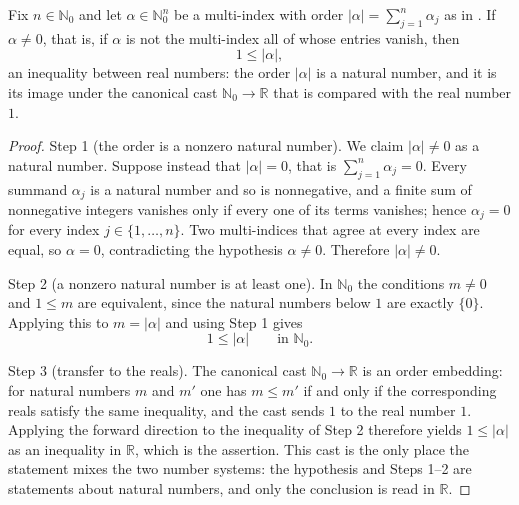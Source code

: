 \begin{lemma}
Fix $n \in \mathbb{N}_0$ and let $\alpha \in \mathbb{N}_0^n$ be a multi-index
with order $|\alpha| = \sum_{j=1}^n \alpha_j$ as in .
If $\alpha \neq 0$, that is, if $\alpha$ is not the multi-index all of whose
entries vanish, then
\[
  1 \leq |\alpha| ,
\]
an inequality between real numbers: the order $|\alpha|$ is a natural number,
and it is its image under the canonical cast $\mathbb{N}_0 \to \mathbb{R}$ that
is compared with the real number $1$.
\end{lemma}
\begin{proof}
Step 1 (the order is a nonzero natural number).  We claim $|\alpha| \neq 0$ as a
natural number.  Suppose instead that $|\alpha| = 0$, that is
$\sum_{j=1}^n \alpha_j = 0$.  Every summand $\alpha_j$ is a natural number and
so is nonnegative, and a finite sum of nonnegative integers vanishes only if
every one of its terms vanishes; hence $\alpha_j = 0$ for every index
$j \in \{1,\ldots,n\}$.  Two multi-indices that agree at every index are equal,
so $\alpha = 0$, contradicting the hypothesis $\alpha \neq 0$.  Therefore
$|\alpha| \neq 0$.

Step 2 (a nonzero natural number is at least one).  In $\mathbb{N}_0$ the
conditions $m \neq 0$ and $1 \leq m$ are equivalent, since the natural numbers
below $1$ are exactly $\{0\}$.  Applying this to $m = |\alpha|$ and using
Step 1 gives
\[
  1 \leq |\alpha| \qquad \text{in } \mathbb{N}_0 .
\]

Step 3 (transfer to the reals).  The canonical cast $\mathbb{N}_0 \to \mathbb{R}$
is an order embedding: for natural numbers $m$ and $m'$ one has $m \leq m'$ if
and only if the corresponding reals satisfy the same inequality, and the cast
sends $1$ to the real number $1$.  Applying the forward direction to the
inequality of Step 2 therefore yields $1 \leq |\alpha|$ as an inequality in
$\mathbb{R}$, which is the assertion.  This cast is the only place the statement
mixes the two number systems: the hypothesis and Steps 1--2 are statements about
natural numbers, and only the conclusion is read in $\mathbb{R}$.
\end{proof}
